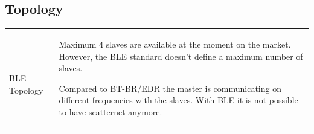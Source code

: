 	\subsection{Topology}
		\begin{tabular}{ll}
			\parbox{9cm}{
				 \\ BLE Topology 
			}	
			& \parbox{9cm}{
				Maximum 4 slaves are available at the moment on the market. However, the BLE standard doesn't define a maximum number of slaves.
				
				Compared to BT-BR/EDR the master is communicating on different frequencies with the slaves.
				With BLE it is not possible to have scatternet anymore.
			}	
		\end{tabular}
